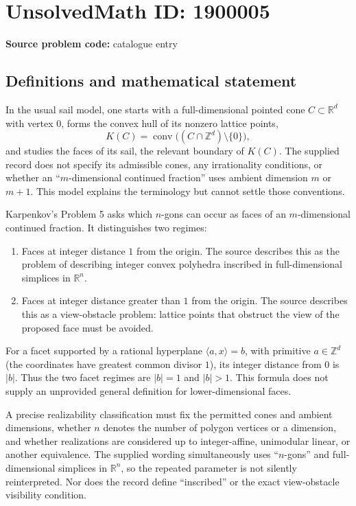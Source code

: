 \documentclass[11pt]{article}
\newcommand{\Z}{\mathbb{Z}}
\newcommand{\R}{\mathbb{R}}
\begin{document}
\section*{UnsolvedMath ID: 1900005}
\textbf{Source problem code:} catalogue entry
\subsection{Definitions and mathematical statement}
In the usual sail model, one starts with a full-dimensional pointed cone $C\subset\R^d$ with vertex $0$, forms the convex hull of its nonzero lattice points,
\[
K(C)=\operatorname{conv}\bigl((C\cap\Z^d)\setminus\{0\}\bigr),
\]
and studies the faces of its sail, the relevant boundary of $K(C)$. The supplied record does not specify its admissible cones, any irrationality conditions, or whether an ``$m$-dimensional continued fraction'' uses ambient dimension $m$ or $m+1$. This model explains the terminology but cannot settle those conventions.

Karpenkov's Problem 5 asks which $n$-gons can occur as faces of an $m$-dimensional continued fraction. It distinguishes two regimes:
\begin{enumerate}
\item Faces at integer distance $1$ from the origin. The source describes this as the problem of describing integer convex polyhedra inscribed in full-dimensional simplices in $\R^n$.
\item Faces at integer distance greater than $1$ from the origin. The source describes this as a view-obstacle problem: lattice points that obstruct the view of the proposed face must be avoided.
\end{enumerate}
For a facet supported by a rational hyperplane $\langle a,x\rangle=b$, with primitive $a\in\Z^d$ (the coordinates have greatest common divisor $1$), its integer distance from $0$ is $|b|$. Thus the two facet regimes are $|b|=1$ and $|b|>1$. This formula does not supply an unprovided general definition for lower-dimensional faces.

A precise realizability classification must fix the permitted cones and ambient dimensions, whether $n$ denotes the number of polygon vertices or a dimension, and whether realizations are considered up to integer-affine, unimodular linear, or another equivalence. The supplied wording simultaneously uses ``$n$-gons'' and full-dimensional simplices in $\R^n$, so the repeated parameter is not silently reinterpreted. Nor does the record define ``inscribed'' or the exact view-obstacle visibility condition.
\end{document}
